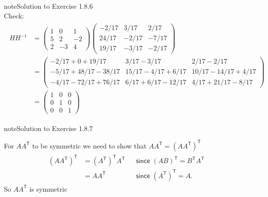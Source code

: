 \documentclass[letterpaper,10pt,english]{jupyterBook}
\begin{document}
\begin{sphinxadmonition}{note}{Solution to Exercise 1.8.6}
\begin{equation*}
\end{equation*}
\sphinxAtStartPar
Check:
\begin{equation*}
\begin{split} \begin{align*}
    HH^{-1} &=
    \begin{pmatrix}
        1 &  0 &  1 \\
        5 &  2 & -2 \\
        2 & -3 &  4 
    \end{pmatrix}
    \begin{pmatrix}
        -2/17 &  3/17 &  2/17 \\
        24/17 & -2/17 & -7/17 \\
        19/17 & -3/17 & -2/17
    \end{pmatrix}
    \\
    &=
    \begin{pmatrix}
        -2/17 +  0    + 19/17 &  3/17 - 3/17         &  2/17 - 2/17 \\
        -5/17 + 48/17 - 38/17 & 15/17 - 4/17 +  6/17 & 10/17 - 14/17 + 4/17 \\ 
        -4/17 - 72/17 + 76/17 &  6/17 + 6/17 - 12/17 &  4/17 + 21/17 - 8/17
    \end{pmatrix}
    \\
    &=
    \begin{pmatrix}
        1 & 0 & 0 \\
        0 & 1 & 0 \\
        0 & 0 & 1
    \end{pmatrix}
\end{align*} \end{split}
\end{equation*}\end{sphinxadmonition}
 \label{_pages/A1_Matrices_exercises_solutions:_pages/A1_Matrices_exercises_solutions-solution-6}

\begin{sphinxadmonition}{note}{Solution to Exercise 1.8.7}



\sphinxAtStartPar
For \(AA^\mathsf{T}\) to be symmetric we need to show that \(AA^\mathsf{T} = (AA^\mathsf{T})^\mathsf{T}\)
\begin{equation*}
\begin{split} \begin{align*}
    (AA^\mathsf{T})^\mathsf{T} &= 
    (A^\mathsf{T})^\mathsf{T}A^\mathsf{T} && \textsf{since $(AB)^\mathsf{T} = B^\mathsf{T}A^\mathsf{T}$} \\
    &= AA^\mathsf{T} && \textsf{since $(A^\mathsf{T})^\mathsf{T} = A$.}
\end{align*} \end{split}
\end{equation*}
\sphinxAtStartPar
So \(AA^\mathsf{T}\) is symmetric
\end{sphinxadmonition}
 \label{_pages/A1_Matrices_exercises_solutions:_pages/A1_Matrices_exercises_solutions-solution-7}
\end{document}
